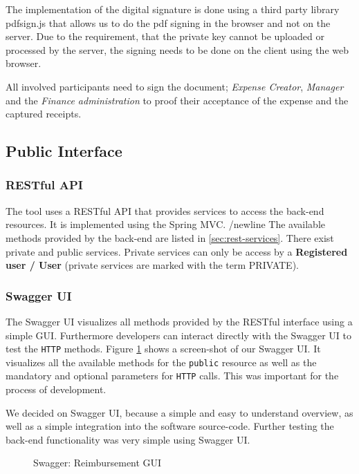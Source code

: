 The implementation of the digital signature is done using a third party library pdfsign.js \cite{pdfsign} that allows us to do the pdf signing in the browser and not on the server. Due to the requirement, that the private key cannot be uploaded or processed by the server, the signing needs to be done on the client using the web browser.\par

All involved participants need to sign the document; \textit{Expense Creator}, \textit{Manager} and the \textit{Finance administration} to proof their acceptance of the expense and the captured receipts. \par

\subsection{Public Interface}

\subsubsection{RESTful API}
\label{sec:restfulapi}
The tool uses a RESTful API that provides services to access the back-end resources. It is implemented using the Spring MVC. /newline
The available methods provided by the back-end are listed in \ref{sec:rest-services}. There exist private and public services. Private services can only be access by a \textbf{Registered user / User} (private services are marked with the term PRIVATE).

\subsubsection{Swagger UI}
The Swagger UI visualizes all methods provided by the RESTful interface using a simple GUI. Furthermore developers can interact directly with the Swagger UI to test the \texttt{HTTP} methods. Figure \ref{fig:swagger01} shows a screen-shot of our Swagger UI. It visualizes all the available methods for the \texttt{public} resource as well as the mandatory and optional parameters for \texttt{HTTP} calls. This was important for the process of development. \cite{swagger} \par
We decided on Swagger UI, because a simple and easy to understand overview, as well as a simple integration into the software source-code. Further testing the back-end functionality was very simple using Swagger UI.

\begin{figure}[H]
	\centering
	\caption{Swagger: Reimbursement GUI}
	\label{fig:swagger01}
\end{figure}

